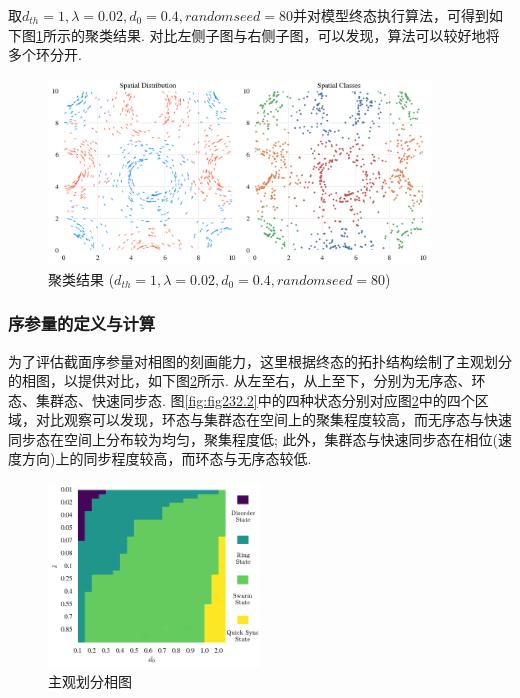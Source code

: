 \documentclass{article}
\begin{document}
取$d_{th}=1, \lambda=0.02, d_0=0.4, random seed=80$并对模型终态执行算法，可得到如下图\ref{fig:fig233.1}所示的聚类结果. 对比左侧子图与右侧子图，可以发现，算法可以较好地将多个环分开.

\begin{figure}[H]
	\centering
	\includegraphics[width=0.9\textwidth]{./figs/ClusteringResult.png}
	\vspace{-0.4cm}
	\caption{聚类结果 ($d_{th}=1, \lambda=0.02, d_0=0.4, random seed=80$)}
	\label{fig:fig233.1}
\end{figure}

\subsubsection{序参量的定义与计算}

为了评估截面序参量对相图的刻画能力，这里根据终态的拓扑结构绘制了主观划分的相图，以提供对比，如下图\ref{fig:fig234.1}所示. 从左至右，从上至下，分别为无序态、环态、集群态、快速同步态. 图\ref{fig:fig232.2}中的四种状态分别对应图\ref{fig:fig234.1}中的四个区域，对比观察可以发现，环态与集群态在空间上的聚集程度较高，而无序态与快速同步态在空间上分布较为均匀，聚集程度低; 此外，集群态与快速同步态在相位(速度方向)上的同步程度较高，而环态与无序态较低.

\begin{figure}[H]
	\centering
	\includegraphics[width=0.5\textwidth]{./figs/subjectiveOp2.png}
	\vspace{-0.5cm}
	\caption{主观划分相图}
	\label{fig:fig234.1}
\end{figure}
\vspace{-0.5cm}
\end{document}
